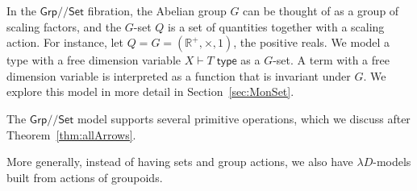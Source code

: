 \documentclass[a4paper,UKenglish]{lipics}
\theoremstyle{plain}
\newcommand{\msf}[1]{\mathsf{#1}} %
\newcommand{\Grp}{\msf{Grp}}
\newcommand{\Set}{\msf{Set}}
\newcommand{\Lslice}[1]{#1/\!/\Set}
\newcommand{\GrpSet}{\Lslice{\Grp}}
\newcommand{\Tj}[2]{#1 \vdash #2 \; \msf{ type}}
\newcommand{\Dvar}{X}
\begin{document}
\begin{example}
In the $\GrpSet$ fibration, the Abelian group $G$ can be thought of as a group of scaling factors, and the $G$-set $Q$ is a set of quantities together with a scaling action. For instance, let $Q=G=(\mathbb R^+,\times,1)$, the positive reals. We model a type with a free dimension variable $\Tj\Dvar T$ as a $G$-set. A term with a free dimension variable is interpreted as a function that is invariant under $G$. We explore this model in more detail in Section~\ref{sec:MonSet}.

The $\GrpSet$ model supports several primitive operations, which we discuss after Theorem~\ref{thm:allArrows}. \end{example}

More generally, instead of having sets and group actions, we also have $\lambda D$-models built from actions of groupoids.
\end{document}
